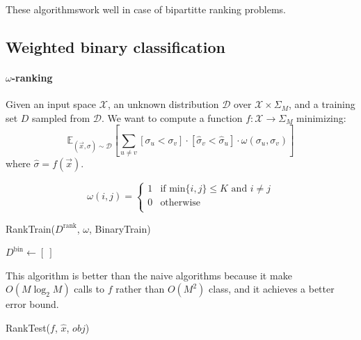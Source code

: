 \documentclass[a4paper,6pt,twocolumn,fleqn]{article}
\begin{document}
These algorithmswork well in case of bipartitte ranking problems.
\subsection{Weighted binary classification} %
\paragraph{\(\omega\)-ranking} Given an input space \(\mathcal{X}\), an unknown distribution \(\mathcal{D}\) over \(\mathcal{X} \times \Sigma_M\), and a training set \(D\) sampled from \(\mathcal{D}\). We want to compute a function \(f : \mathcal{X} \to \Sigma_M\) minimizing:
\begin{equation}
    \mathbb{E}_{(\vec{x},\sigma) \sim \mathcal{D}} \left[ \sum_{u \neq v} [\sigma_u < \sigma_v] \cdot [\hat{\sigma}_v < \hat{\sigma}_u] \cdot \omega ( \sigma_u , \sigma_v ) \right]
\end{equation}
where \(\hat{\sigma} = f(\vec{x})\).

\begin{equation}
    \omega(i,j) = \begin{cases}
        1 &\text{if min}\{i,j\} \leq K \text{ and } i \neq j\\
        0 &\text{otherwise}\\
    \end{cases}
\end{equation}

\begin{algorithm}
    \caption{RankTrain($D^\text{rank}$, $\omega$, BinaryTrain)}
    \label{alg:rank_train}
    $D^\text{bin} \gets [\ ]$\;
        \end{algorithm}
        This algorithm is better than the naive algorithms because it make \(O(M \log_2 M)\) calls to \(f\) rather than \(O(M^2)\) class, and it achieves a better error bound.
        \begin{algorithm}
            \caption{RankTest($f$, $\hat{x}$, $obj$)}
            \label{alg:rank_test}
\end{algorithm}
\end{document}
